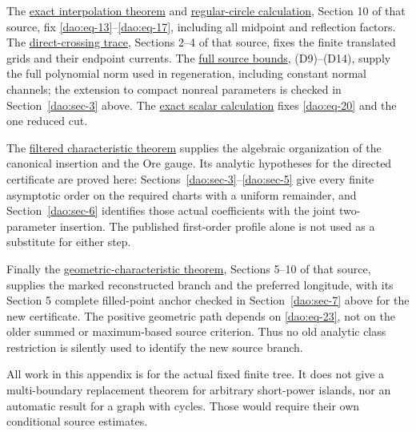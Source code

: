 The \href{https://sashakolpakov.github.io/murakamis_dream/notes/exact_factorial_interpolation_and_complex_contours.html}{exact interpolation theorem} and \href{https://sashakolpakov.github.io/murakamis_dream/notes/actual_main_meridian_regular_circle_trace.html}{regular-circle calculation}, Section 10 of that source, fix \eqref{dao:eq-13}--\eqref{dao:eq-17}, including all midpoint and reflection factors. The \href{https://sashakolpakov.github.io/murakamis_dream/notes/actual_main_meridian_direct_crossing_trace.html}{direct-crossing trace}, Sections 2--4 of that source, fixes the finite translated grids and their endpoint currents. The \href{https://sashakolpakov.github.io/murakamis_dream/notes/actual_main_meridian_source_bounds.html}{full source bounds}, (D9)--(D14), supply the full polynomial norm used in regeneration, including constant normal channels; the extension to compact nonreal parameters is checked in Section~\ref{dao:sec-3} above. The \href{https://sashakolpakov.github.io/murakamis_dream/notes/actual_main_meridian_exact_scalar.html}{exact scalar calculation} fixes \eqref{dao:eq-20} and the one reduced cut.

The \href{https://sashakolpakov.github.io/murakamis_dream/notes/actual_main_meridian_filtered_characteristic.html}{filtered characteristic theorem} supplies the algebraic organization of the canonical insertion and the Ore gauge. Its analytic hypotheses for the directed certificate are proved here: Sections~\ref{dao:sec-3}--\ref{dao:sec-5} give every finite asymptotic order on the required charts with a uniform remainder, and Section~\ref{dao:sec-6} identifies those actual coefficients with the joint two-parameter insertion. The published first-order profile alone is not used as a substitute for either step.

Finally the \href{https://sashakolpakov.github.io/murakamis_dream/notes/actual_all_circle_geometric_characteristic.html}{geometric-characteristic theorem}, Sections 5--10 of that source, supplies the marked reconstructed branch and the preferred longitude, with its Section 5 complete filled-point anchor checked in Section~\ref{dao:sec-7} above for the new certificate. The positive geometric path depends on \eqref{dao:eq-23}, not on the older summed or maximum-based source criterion. Thus no old analytic class restriction is silently used to identify the new source branch.

All work in this appendix is for the actual fixed finite tree. It does not give a multi-boundary replacement theorem for arbitrary short-power islands, nor an automatic result for a graph with cycles. Those would require their own conditional source estimates.
